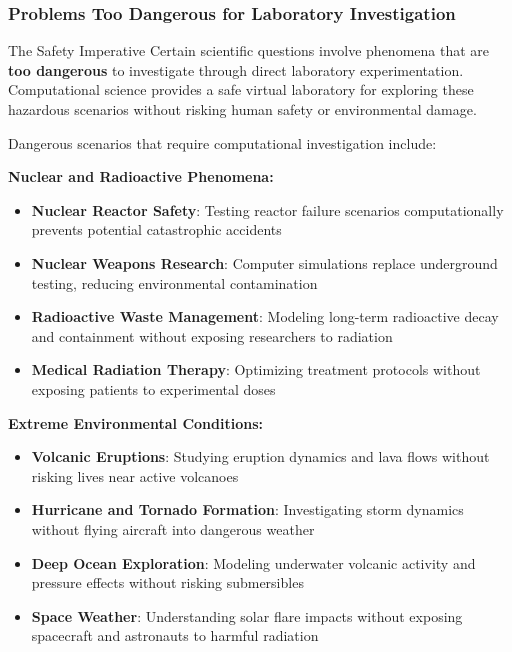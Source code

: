 \subsubsection{Problems Too Dangerous for Laboratory Investigation}

\begin{warningbox}{The Safety Imperative}
Certain scientific questions involve phenomena that are \textbf{too dangerous} to investigate through direct laboratory experimentation. Computational science provides a safe virtual laboratory for exploring these hazardous scenarios without risking human safety or environmental damage.
\end{warningbox}

Dangerous scenarios that require computational investigation include:

\textbf{Nuclear and Radioactive Phenomena:}
\begin{itemize}
    \item \textbf{Nuclear Reactor Safety}: Testing reactor failure scenarios computationally prevents potential catastrophic accidents
    \item \textbf{Nuclear Weapons Research}: Computer simulations replace underground testing, reducing environmental contamination
    \item \textbf{Radioactive Waste Management}: Modeling long-term radioactive decay and containment without exposing researchers to radiation
    \item \textbf{Medical Radiation Therapy}: Optimizing treatment protocols without exposing patients to experimental doses
\end{itemize}

\textbf{Extreme Environmental Conditions:}
\begin{itemize}
    \item \textbf{Volcanic Eruptions}: Studying eruption dynamics and lava flows without risking lives near active volcanoes
    \item \textbf{Hurricane and Tornado Formation}: Investigating storm dynamics without flying aircraft into dangerous weather
    \item \textbf{Deep Ocean Exploration}: Modeling underwater volcanic activity and pressure effects without risking submersibles
    \item \textbf{Space Weather}: Understanding solar flare impacts without exposing spacecraft and astronauts to harmful radiation
\end{itemize}

